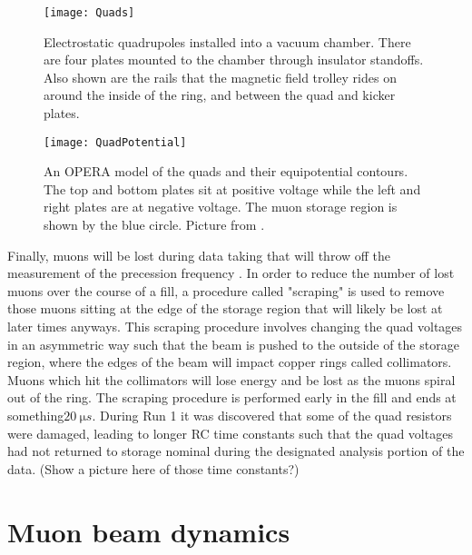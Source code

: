 \begin{figure}[]
    \centering
    \texttt{[image: Quads]}
    \caption[Electrostatic quadrupoles installed in a vacuum chamber]{Electrostatic quadrupoles installed into a vacuum chamber. There are four plates mounted to the chamber through insulator standoffs. Also shown are the rails that the magnetic field trolley rides on around the inside of the ring, and between the quad and kicker plates.}   
    \label{fig:Quads}
\end{figure}

\begin{figure}[]
    \centering
    \texttt{[image: QuadPotential]}
    \caption[Electrostatic quadrupole potentials]{An OPERA model of the quads and their equipotential contours. The top and bottom plates sit at positive voltage while the left and right plates are at negative voltage. The muon storage region is shown by the blue circle. Picture from .}   
    \label{fig:QuadPotential}
\end{figure}


Finally, muons will be lost during data taking that will throw off the measurement of the precession frequency \wa. In order to reduce the number of lost muons over the course of a fill, a procedure called "scraping" is used to remove those muons sitting at the edge of the storage region that will likely be lost at later times anyways. This scraping procedure involves changing the quad voltages in an asymmetric way such that the beam is pushed to the outside of the storage region, where the edges of the beam will impact copper rings called collimators. Muons which hit the collimators will lose energy and be lost as the muons spiral out of the ring. The scraping procedure is performed early in the fill and ends at something$\SI{20}{\micro s}$. During Run 1 it was discovered that some of the quad resistors were damaged, leading to longer RC time constants such that the quad voltages had not returned to storage nominal during the designated analysis portion of the data. (Show a picture here of those time constants?)




\section{Muon beam dynamics}

